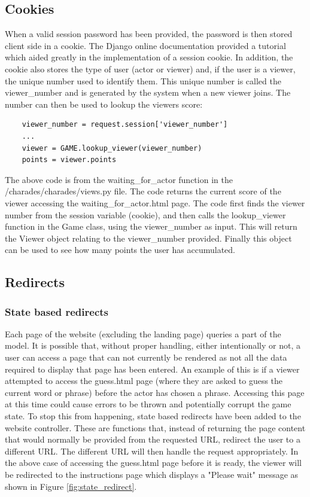 \subsection{Cookies}
When a valid session password has been provided, the password is then stored client side in a cookie. The Django online documentation \cite{django_cookies} provided a tutorial which aided greatly in the implementation of a session cookie. In addition, the cookie also stores the type of user (actor or viewer) and, if the user is a viewer, the unique number used to identify them. This unique number is called the viewer\_number and is generated by the system when a new viewer joins. The number can then be used to lookup the viewers score:

\begin{verbatim}
	viewer_number = request.session['viewer_number']
	...
	viewer = GAME.lookup_viewer(viewer_number)
	points = viewer.points
\end{verbatim}

The above code is from the waiting\_for\_actor function in the /charades/charades/views.py file. The code returns the current score of the viewer accessing the waiting\_for\_actor.html page. The code first finds the viewer number from the session variable (cookie), and then calls the lookup\_viewer function in the Game class, using the viewer\_number as input. This will return the Viewer object relating to the viewer\_number provided. Finally this object can be used to see how many points the user has accumulated.

\subsection{Redirects}
\subsubsection{State based redirects}
Each page of the website (excluding the landing page) queries a part of the model. It is possible that, without proper handling, either intentionally or not, a user can access a page that can not currently be rendered as not all the data required to display that page has been entered. An example of this is if a viewer attempted to access the guess.html page (where they are asked to guess the current word or phrase) before the actor has chosen a phrase. Accessing this page at this time could cause errors to be thrown and potentially corrupt the game state. To stop this from happening, state based redirects have been added to the website controller. These are functions that, instead of returning the page content that would normally be provided from the requested URL, redirect the user to a different URL. The different URL will then handle the request appropriately. In the above case of accessing the guess.html page before it is ready, the viewer will be redirected to the instructions page which displays a "Please wait" message as shown in Figure \ref{fig:state_redirect}.


